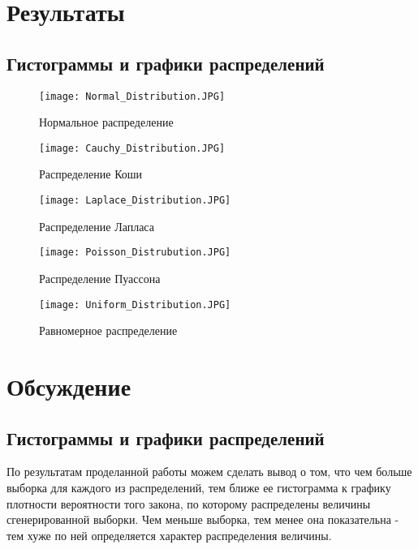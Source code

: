 \documentclass[a4paper]{article}
\begin{document}
\section{Результаты}
    \subsection{Гистограммы и графики распределений}
        \begin{figure}[H]
            \centering
            \texttt{[image: Normal\_Distribution.JPG]}
            \caption{Нормальное распределение}
            \label{fig:my_label}
        \end{figure}
        
        \begin{figure}[H]
            \centering
            \texttt{[image: Cauchy\_Distribution.JPG]}
            \caption{Распределение Коши}
            \label{fig:my_label}
        \end{figure}
        
        \begin{figure}[H]
            \centering
            \texttt{[image: Laplace\_Distribution.JPG]}
            \caption{Распределение Лапласа}
            \label{fig:my_label}
        \end{figure}
        
        \begin{figure}[H]
            \centering
            \texttt{[image: Poisson\_Distrubution.JPG]}
            \caption{Распределение Пуассона}
            \label{fig:my_label}
        \end{figure}
        
        \begin{figure}[H]
            \centering
            \texttt{[image: Uniform\_Distribution.JPG]}
            \caption{Равномерное распределение}
            \label{fig:my_label}
        \end{figure}

    
\section{Обсуждение}
    \subsection{Гистограммы и графики распределений}
        По результатам проделанной работы можем сделать вывод о том, что чем
больше выборка для каждого из распределений, тем ближе ее гистограмма
к графику плотности вероятности того закона, по которому распределены
величины сгенерированной выборки. Чем меньше выборка, тем менее она
показательна - тем хуже по ней определяется характер распределения величины.
        
\end{document}
